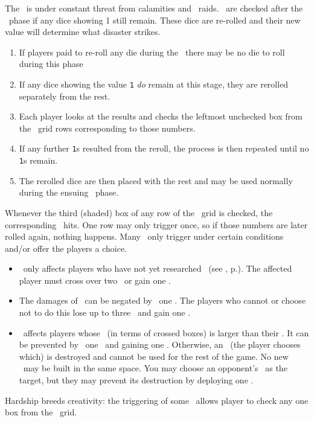 The \planet\ is under constant threat from calamities and \pirate\ raids.  \disasters\ are checked after the \diplomacy\ phase if any dice showing 1 still remain.  These dice are re-rolled and their new value will determine what disaster strikes.
\begin{enumerate}
  \item If players paid to re-roll any die during the \diplomacy\ there may be no die to roll during this phase
  \item If any dice showing the value \texttt{1} \textit{do} remain at this stage, they are rerolled separately from the rest.
  \item Each player looks at the results and checks the leftmost unchecked box from the \disaster\ grid rows corresponding to those numbers.
  \item If any further \texttt{1}s resulted from the reroll, the process is then repeated until no \texttt{1}s remain.
  \item The rerolled dice are then placed with the rest and may be used normally during the ensuing \development\ phase.
\end{enumerate}
Whenever the third (shaded) box of any row of the \disaster\ grid is checked, the corresponding \disaster\ hits.  One row may only trigger once, so if those numbers are later rolled again, nothing happens.
\newline\newline
Many \disasters\ only trigger under certain conditions and/or offer the players a choice.
\begin{itemize}
  \item \pandemic\ only affects players who have not yet researched \cure\ (see , p.\pageref{sec:disasters}). The affected player must cross over two \population\ or gain one \unhappiness.
  \item The damages of \war\ can be negated by \deploying\ one \squadron.  The players who cannot or choose not to do this lose up to three \currency\ and gain one \unhappiness.
  \item \terrorism\ affects players whose \unhappiness\ (in terms of crossed boxes) is larger than their \happiness.  It can be prevented by \deploying\ one \squadron\ and gaining one \unhappiness.  Otherwise, an \armament\ (the player chooses which) is destroyed and cannot be used for the rest of the game.  No new \armaments\ may be built in the same space.  You may choose an opponent's \battleship\ as the target, but they may prevent its destruction by deploying one \squadron.
\end{itemize}
Hardship breeds creativity: the triggering of some \disasters\ allows player to check any one box from the \culture\ grid.

